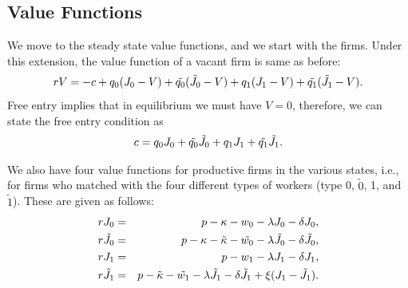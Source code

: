 \documentclass[12pt]{article} %
\theoremstyle{definition}
\begin{document}
\subsection*{Value Functions}\label{regain value functions}
We move to the steady state value functions, and we start with the firms. Under this extension, the value function of a vacant firm is same as before:
\begin{equation}
   rV = -c + q_0 (J_0-V) + \Tilde{q_0}(\Tilde{J_0}-V) + q_1 (J_1-V) + \Tilde{q_1}(\Tilde{J_1}-V).\nonumber 
\end{equation}Free entry implies that in equilibrium we must have $V=0$, therefore, we can state the free entry condition as 
\begin{equation}
   c= q_0 J_0 + \Tilde{q_0}\Tilde{J_0} + q_1 J_1 + \Tilde{q_1}\Tilde{J_1}.\label{eq free entry} 
\end{equation}

We also have four value functions for productive firms in the various states, i.e., for firms who matched with the four different types of workers (type 0, $\tilde{0}$, 1, and $\tilde{1}$). These are given as follows:   
\begin{eqnarray}
    rJ_0 &=&p-\kappa-w_0-\lambda J_0 - \delta J_0,\label{eq J0} \\
    r\Tilde{J_0} &=&p-\kappa-\Tilde{\kappa}-\Tilde{w_0}-\lambda \Tilde{J_0} - \delta \Tilde{J_0},\label{eq J0 tilde}\\
    rJ_1 &=&p-w_1-\lambda J_1 - \delta J_1, \label{eq J1} \\
        r\Tilde{J_1} &=&p-\Tilde{\kappa}-\Tilde{w_1}-\lambda \Tilde{J_1} - \delta \Tilde{J_1} + \xi(J_1-\tilde{J_1}) . \label{eq J1 tilde}
    \end{eqnarray}
\end{document}
